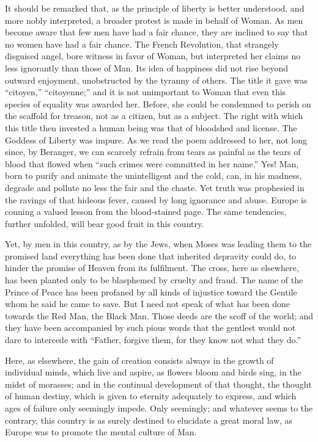 It should be remarked that, as the principle of liberty is better
understood, and more nobly interpreted, a broader protest is made in
behalf of Woman. As men become aware that few men have had a fair
chance, they are inclined to say that no women have had a fair chance.
The French Revolution, that strangely disguised angel, bore witness in
favor of Woman, but interpreted her claims no less ignorantly than
those of Man. Its idea of happiness did not rise beyond outward
enjoyment, unobstructed by the tyranny of others. The title it gave
was ``citoyen,'' ``citoyenne;'' and it is not unimportant to Woman
that even this species of equality was awarded her. Before, she could
be condemned to perish on the scaffold for treason, not as a citizen,
but as a subject. The right with which this title then invested a
human being was that of bloodshed and license. The Goddess of Liberty
was impure. As we read the poem addressed to her, not long since, by
Beranger, we can scarcely refrain from tears as painful as the tears
of blood that flowed when ``such crimes were committed in her name.''
Yes! Man, born to purify and animate the unintelligent and the cold,
can, in his madness, degrade and pollute no less the fair and the
chaste. Yet truth was prophesied in the ravings of that hideous fever,
caused by long ignorance and abuse. Europe is conning a valued lesson
 from the blood-stained page. The same tendencies, further
unfolded, will bear good fruit in this country.

Yet, by men in this country, as by the Jews, when Moses was leading
them to the promised land everything has been done that inherited
depravity could do, to hinder the promise of Heaven from its
fulfilment. The cross, here as elsewhere, has been planted only to be
blasphemed by cruelty and fraud. The name of the Prince of Peace has
been profaned by all kinds of injustice toward the Gentile whom he
said he came to save. But I need not speak of what has been done
towards the Red Man, the Black Man. Those deeds are the scoff of the
world; and they have been accompanied by such pious words that the
gentlest would not dare to intercede with ``Father, forgive them, for
they know not what they do.''

Here, as elsewhere, the gain of creation consists always in the growth
of individual minds, which live and aspire, as flowers bloom and birds
sing, in the midst of morasses; and in the continual development of
that thought, the thought of human destiny, which is given to eternity
adequately to express, and which ages of failure only seemingly
impede. Only seemingly; and whatever seems to the contrary, this
country is as surely destined to elucidate a great moral law, as
Europe was to promote the mental culture of Man.

